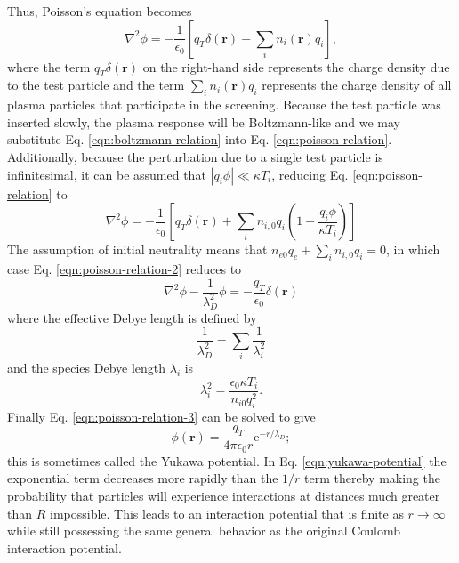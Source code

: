 Thus, Poisson's equation becomes
\begin{equation} \label{eqn:poisson-relation}
    \nabla^2 \phi = - \dfrac{1}{\epsilon_0} \left[q_T \delta(\boldsymbol{r}) + \sum\limits_{i} n_i(\boldsymbol{r}) q_i\right],
\end{equation}
where the term $q_T \delta(\boldsymbol{r})$ on the right-hand side represents the charge density due to the test particle and the term $\sum\limits_{i} n_i(\boldsymbol{r}) q_i$ represents the charge density of all plasma particles that participate in the screening. Because the test particle was inserted slowly, the plasma response will be Boltzmann-like and we may substitute Eq. \eqref{eqn:boltzmann-relation} into Eq. \eqref{eqn:poisson-relation}. Additionally, because the perturbation due to a single test particle is infinitesimal, it can be assumed that $|q_i \phi| \ll \kappa T_i$, reducing Eq. \eqref{eqn:poisson-relation} to 
\begin{equation} \label{eqn:poisson-relation-2}
    \nabla^2 \phi = - \dfrac{1}{\epsilon_0} \left[q_T \delta(\boldsymbol{r}) + \sum\limits_{i} n_{i,0} q_i \left(1 - \dfrac{q_i \phi}{\kappa T_i}\right) \right]
\end{equation}
The assumption of initial neutrality means that $n_{e0}q_e + \sum\limits_{i} n_{i,0} q_i = 0$, in which case Eq. \eqref{eqn:poisson-relation-2} reduces to
\begin{equation} \label{eqn:poisson-relation-3}
    \nabla^2 \phi - \dfrac{1}{\lambda_D^2} \phi = - \dfrac{q_T}{\epsilon_0} \delta(\boldsymbol{r})
\end{equation}
where the effective Debye length is defined by
\begin{equation}
    \dfrac{1}{\lambda_D^2} = \sum\limits_i \dfrac{1}{\lambda_i^2}
\end{equation}
and the species Debye length $\lambda_i$ is
\begin{equation}
    \lambda_i^2 = \dfrac{\epsilon_0 \kappa T_i}{n_{i0}q_i^2}.
\end{equation}
Finally Eq. \eqref{eqn:poisson-relation-3} can be solved to give
\begin{equation} \label{eqn:yukawa-potential}
    \phi(\boldsymbol{r}) = \dfrac{q_T}{4 \pi \epsilon_0 r} \text{e}^{-r/\lambda_D};
\end{equation}
this is sometimes called the Yukawa potential. In Eq. \eqref{eqn:yukawa-potential} the exponential term decreases more rapidly than the $1/r$ term thereby making the probability that particles will experience interactions at distances much greater than $R$ impossible. This leads to an interaction potential that is finite as $r \rightarrow \infty$ while still possessing the same general behavior as the original Coulomb interaction potential.

